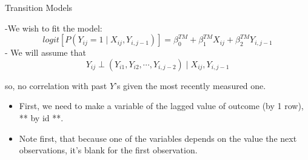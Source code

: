 \documentclass[ignorenonframetext,]{beamer}
\providecommand{\tightlist}{%
  \setlength{\itemsep}{0pt}\setlength{\parskip}{0pt}}
\begin{document}
\begin{frame}{Transition Models}

-We wish to fit the model:
\[logit[P(Y_{ij}=1 \mid X_{ij}, Y_{i,j-1})] = \beta_0^{TM}+\beta_1^{TM}X_{ij}+\beta_2^{TM} Y_{i,j-1}\]
- We will assume that
\[Y_{ij} \perp (Y_{i1},Y_{i2},\cdots,Y_{i,j-2}) \mid X_{ij},Y_{i,j-1}\]

so, no correlation with past \(Y\)'s given the most recently measured
one.

\begin{itemize}
\tightlist
\item
  First, we need to make a variable of the lagged value of outcome (by 1
  row), ** by id **.
\item
  Note first, that because one of the variables depends on the value the
  next observations, it's blank for the first observation.
\end{itemize}

\end{frame}
\end{document}
